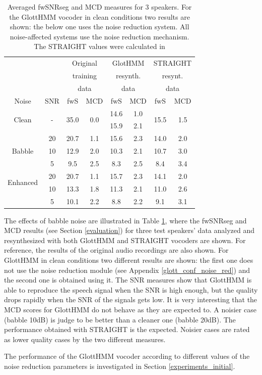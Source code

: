 \begin{table}[!htb]
\begin{centering}
\begin{tabular}{c c|c c|c c|c c}
	 & & \multicolumn{2}{c|}{Original} & \multicolumn{2}{c|}{GlotHMM} & \multicolumn{2}{c}{STRAIGHT}\\
	 & & \multicolumn{2}{c|}{training} & \multicolumn{2}{c|}{resynth.} & \multicolumn{2}{c}{resynt.}\\
	 & & \multicolumn{2}{c|}{data} & \multicolumn{2}{c|}{data} & \multicolumn{2}{c}{data}\\
	Noise & SNR & fwS & MCD & fwS & MCD & fwS & MCD\\
	\midrule
	\midrule
	\multirow{2}{*}{Clean} & \multirow{2}{*}{-} & \multirow{2}{*}{35.0} & \multirow{2}{*}{0.0} & 14.6 & 1.0 & \multirow{2}{*}{15.5} & \multirow{2}{*}{1.5}\\
	 & & & & 15.9 & 2.1 & & \\	
	\midrule
	\multirow{3}{*}{Babble} & 20 & 20.7 & 1.1 & 15.6 & 2.3 & 14.0 & 2.0\\
	 & 10 & 12.9 & 2.0 & 10.3 & 2.1 & 10.7 & 3.0\\
	 & 5 & 9.5 & 2.5 & 8.3 & 2.5 & 8.4 & 3.4\\
	\midrule
	\midrule
	\multirow{2}{*}{Enhanced} & 20 & 20.7 & 1.1 & 15.7 & 2.3 & 14.1 & 2.0\\
	\multirow{2}{*}{Babble} & 10 & 13.3 & 1.8 & 11.3 & 2.1 & 11.0 & 2.6\\
	 & 5 & 10.1 & 2.2 & 8.8 & 2.2 & 9.1 & 3.1\\
	\bottomrule
\end{tabular}
\caption{Averaged fwSNRseg and MCD measures for 3 speakers. For the GlottHMM vocoder in clean conditions two results are shown: the below one uses the noise reduction system. All noise-affected systems use the noise reduction mechanism. The STRAIGHT values were calculated in \cite{karhila_jstsp_14}}
\label{table:an_resyn_results}
\end{centering}
\end{table}

The effects of babble noise are illustrated in Table \ref{table:an_resyn_results}, where the fwSNRseg and MCD results (see Section \ref{evaluation}) for three test speakers' data analyzed and resynthesized with both GlottHMM and STRAIGHT vocoders are shown.
%
For reference, the results of the original audio recordings are also shown.
%
For GlottHMM in clean conditions two different results are shown: the first one does not use the noise reduction module (see Appendix \ref{glott_conf_noise_red}) and the second one is obtained using it.
%
The SNR measures show that GlottHMM is able to reproduce the speech signal when the SNR is high enough, but the quality drops rapidly when the SNR of the signals gets low.
%
It is very interesting that the MCD scores for GlottHMM do not behave as they are expected to.
%
A noisier case (babble 10dB) is judge to be better than a cleaner one (babble 20dB).
%
The performance obtained with STRAIGHT is the expected.
%
Noisier cases are rated as lower quality cases by the two different measures.

The performance of the GlottHMM vocoder according to different values of the noise reduction parameters is investigated in Section \ref{experiments_initial}.